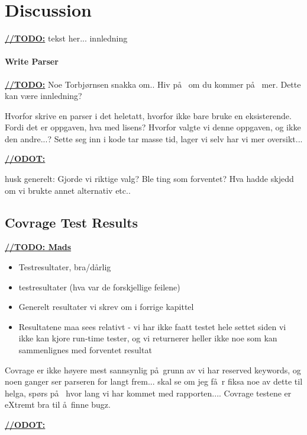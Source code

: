 \chapter{Discussion}
\underline{\textbf{\LARGE //TODO:}} tekst her... innledning
\subsubsection{Write Parser}
\underline{\textbf{\LARGE //TODO:}} Noe Torbj\o rnsen snakka om.. Hiv p\aa~ om du kommer p\aa~ mer. Dette kan v\ae re innledning?

Hvorfor skrive en parser i det heletatt, hvorfor ikke bare bruke en eksisterende. Fordi det er oppgaven, hva med lisens? Hvorfor valgte vi denne oppgaven, og ikke den andre...? Sette seg inn i kode tar masse tid, lager vi selv har vi mer oversikt...

\underline{\textbf{\LARGE //ODOT:}}

husk generelt: Gjorde vi riktige valg? Ble ting som forventet? Hva hadde skjedd om vi brukte annet alternativ etc..







\section{Covrage Test Results}

\underline{\textbf{\LARGE //TODO: Mads}}
\begin{itemize}
\item Testresultater, bra/d\aa rlig
\item testresultater (hva var de forskjellige feilene)
\item Generelt resultater vi skrev om i forrige kapittel
\item Resultatene maa sees relativt - vi har ikke faatt testet hele settet siden
vi ikke kan kjore run-time tester, og vi returnerer heller ikke noe som kan
sammenlignes med forventet resultat
\end{itemize}

Covrage er ikke h\o yere mest sannsynlig p\aa~grunn av vi har reserved keywords, og noen ganger ser parseren for langt frem... skal se om jeg f\aa~r fiksa noe av dette til helga, sp\o rs p\aa~ hvor lang vi har kommet med rapporten.... Covrage testene er eXtremt bra til \aa~finne bugz.

\underline{\textbf{\LARGE //ODOT:}}

